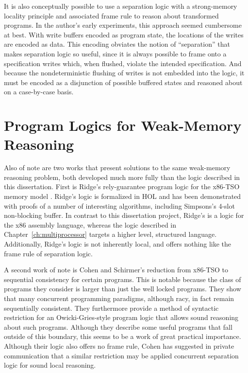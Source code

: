 \documentclass[11pt]{report}         %
\begin{document}
It is also conceptually possible to use a separation logic with a strong-memory locality principle and associated frame rule to reason about transformed programs. In the author's early experiments, this approach seemed cumbersome at best. With write buffers encoded as program state, the locations of the writes are encoded as data. This encoding obviates the notion of ``separation'' that makes separation logic so useful, since it is always possible to frame onto a specification writes which, when flushed, violate the intended specification. And because the nondeterministic flushing of writes is not embedded into the logic, it must be encoded as a disjunction of possible buffered states and reasoned about on a case-by-case basis. 

\section{Program Logics for Weak-Memory Reasoning}
\label{sec:other-weak-memory-program-logics}

Also of note are two works that present solutions to the same weak-memory reasoning problem, both developed much more fully than the logic described in this dissertation. First is Ridge's rely-guarantee program logic for the x86-TSO memory model \cite{DBLP:conf/vstte/Ridge10}. Ridge's logic is formalized in HOL and has been demonstrated with proofs of a number of interesting algorithms, including Simpsons's 4-slot non-blocking buffer. In contrast to this dissertation project, Ridge's is a logic for the x86 assembly language, whereas the logic described in Chapter~\ref{ch:multiprocessor} targets a higher level, structured language. Additionally, Ridge's logic is not inherently local, and offers nothing like the frame rule of separation logic. 

A second work of note is Cohen and Schirmer's \cite{DBLP:conf/itp/CohenS10} reduction from x86-TSO to sequential consistency for certain programs. This is notable because the class of programs they consider is larger than just the well locked programs. They show that many concurrent programming paradigms, although racy, in fact remain sequentially consistent. They furthermore provide a method of syntactic restriction for an Owicki-Gries-style program logic that allows sound reasoning about such programs. Although they describe some useful programs that fall outside of this boundary, this seems to be a work of great practical importance. Although their logic also offers no frame rule, Cohen has suggested in private communication that a similar restriction may be applied concurrent separation logic for sound local reasoning.
\end{document}
